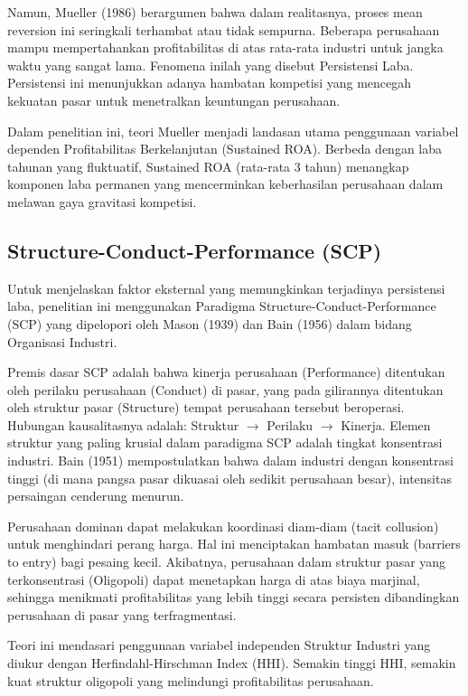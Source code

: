 \documentclass[12pt,a4paper]{report}
\begin{document}
Namun, Mueller (1986) berargumen bahwa dalam realitasnya, proses mean
reversion ini seringkali terhambat atau tidak sempurna. Beberapa
perusahaan mampu mempertahankan profitabilitas di atas rata-rata
industri untuk jangka waktu yang sangat lama. Fenomena inilah yang
disebut Persistensi Laba. Persistensi ini menunjukkan adanya hambatan
kompetisi yang mencegah kekuatan pasar untuk menetralkan keuntungan
perusahaan.

Dalam penelitian ini, teori Mueller menjadi landasan utama penggunaan
variabel dependen Profitabilitas Berkelanjutan (Sustained ROA). Berbeda
dengan laba tahunan yang fluktuatif, Sustained ROA (rata-rata 3 tahun)
menangkap komponen laba permanen yang mencerminkan keberhasilan
perusahaan dalam melawan gaya gravitasi kompetisi.

\hypertarget{structure-conduct-performance-scp}{%
\subsection{Structure-Conduct-Performance
(SCP)}\label{structure-conduct-performance-scp}}

Untuk menjelaskan faktor eksternal yang memungkinkan terjadinya
persistensi laba, penelitian ini menggunakan Paradigma
Structure-Conduct-Performance (SCP) yang dipelopori oleh Mason (1939)
dan Bain (1956) dalam bidang Organisasi Industri.

Premis dasar SCP adalah bahwa kinerja perusahaan (Performance)
ditentukan oleh perilaku perusahaan (Conduct) di pasar, yang pada
gilirannya ditentukan oleh struktur pasar (Structure) tempat perusahaan
tersebut beroperasi. Hubungan kausalitasnya adalah: Struktur \(\to\)
Perilaku \(\to\) Kinerja. Elemen struktur yang paling krusial dalam
paradigma SCP adalah tingkat konsentrasi industri. Bain (1951)
mempostulatkan bahwa dalam industri dengan konsentrasi tinggi (di mana
pangsa pasar dikuasai oleh sedikit perusahaan besar), intensitas
persaingan cenderung menurun.

Perusahaan dominan dapat melakukan koordinasi diam-diam (tacit
collusion) untuk menghindari perang harga. Hal ini menciptakan hambatan
masuk (barriers to entry) bagi pesaing kecil. Akibatnya, perusahaan
dalam struktur pasar yang terkonsentrasi (Oligopoli) dapat menetapkan
harga di atas biaya marjinal, sehingga menikmati profitabilitas yang
lebih tinggi secara persisten dibandingkan perusahaan di pasar yang
terfragmentasi.

Teori ini mendasari penggunaan variabel independen Struktur Industri
yang diukur dengan Herfindahl-Hirschman Index (HHI). Semakin tinggi HHI,
semakin kuat struktur oligopoli yang melindungi profitabilitas
perusahaan.
\end{document}
